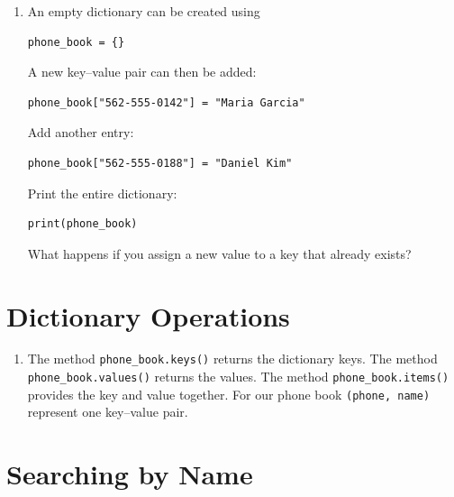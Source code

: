 \documentclass{article}
\begin{document}
\begin{enumerate}

\item An empty dictionary can be created using

\begin{verbatim}
phone_book = {}
\end{verbatim}

A new key--value pair can then be added:

\begin{verbatim}
phone_book["562-555-0142"] = "Maria Garcia"
\end{verbatim}

Add another entry:

\begin{verbatim}
phone_book["562-555-0188"] = "Daniel Kim"
\end{verbatim}

Print the entire dictionary:

\begin{verbatim}
print(phone_book)
\end{verbatim}

What happens if you assign a new value to a key that already exists?

\end{enumerate}


\section{Dictionary Operations}

\begin{enumerate}

\item The method \texttt{phone\_book.keys()} returns the dictionary keys. The method \texttt{phone\_book.values()} returns the values. The method \texttt{phone\_book.items()} provides the key and value together.  For our phone book \texttt{(phone, name)} represent one key--value pair.

\end{enumerate}


\section{Searching by Name}
\end{document}
